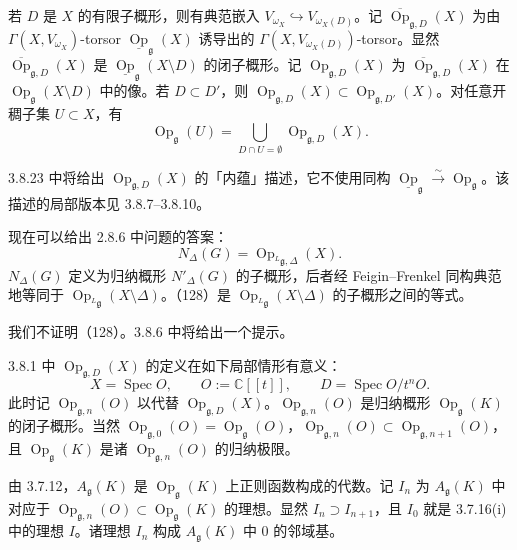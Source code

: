 
若 $D$ 是 $X$ 的有限子概形，则有典范嵌入 $V_{\omega_{X}}\hookrightarrow V_{\omega_{X}(D)}$。记 $\overline{\operatorname{Op}}_{\mathfrak{g},D}(X)$ 为由 $\Gamma(X,V_{\omega_{X}})$-torsor $\underline{\operatorname{Op}}_{\mathfrak{g}}(X)$ 诱导出的 $\Gamma(X,V_{\omega_{X}(D)})$-torsor。显然 $\overline{\operatorname{Op}}_{\mathfrak{g},D}(X)$ 是 $\underline{\operatorname{Op}}_{\mathfrak{g}}(X\setminus D)$ 的闭子概形。记 $\operatorname{Op}_{\mathfrak{g},D}(X)$ 为 $\overline{\operatorname{Op}}_{\mathfrak{g},D}(X)$ 在 $\operatorname{Op}_{\mathfrak{g}}(X\setminus D)$ 中的像。若 $D\subset D'$，则 $\operatorname{Op}_{\mathfrak{g},D}(X)\subset\operatorname{Op}_{\mathfrak{g},D'}(X)$。对任意开稠子集 $U\subset X$，有
\[
\operatorname{Op}_{\mathfrak{g}}(U)=\bigcup_{D\cap U=\emptyset}\operatorname{Op}_{\mathfrak{g},D}(X).
\]

3.8.23 中将给出 $\operatorname{Op}_{\mathfrak{g},D}(X)$ 的「内蕴」描述，它不使用同构 $\underline{\operatorname{Op}}_{\mathfrak{g}}\xrightarrow{\sim}\operatorname{Op}_{\mathfrak{g}}$。该描述的局部版本见 3.8.7--3.8.10。

 现在可以给出 2.8.6 中问题的答案：
\begin{equation}\tag{128}
  N_{\Delta}(G)=\operatorname{Op}_{{}^{L}\mathfrak{g},\Delta}(X).
\end{equation}
$N_{\Delta}(G)$ 定义为归纳概形 $N'_{\Delta}(G)$ 的子概形，后者经 Feigin--Frenkel 同构典范地等同于 $\operatorname{Op}_{{}^{L}\mathfrak{g}}(X\setminus\Delta)$。（128）是 $\operatorname{Op}_{{}^{L}\mathfrak{g}}(X\setminus\Delta)$ 的子概形之间的等式。

我们不证明（128）。3.8.6 中将给出一个提示。

 3.8.1 中 $\operatorname{Op}_{\mathfrak{g},D}(X)$ 的定义在如下局部情形有意义：
\[
X=\operatorname{Spec}O,\qquad O:=\mathbb{C}[[t]],\qquad D=\operatorname{Spec}O/t^{n}O.
\]
此时记 $\operatorname{Op}_{\mathfrak{g},n}(O)$ 以代替 $\operatorname{Op}_{\mathfrak{g},D}(X)$。$\operatorname{Op}_{\mathfrak{g},n}(O)$ 是归纳概形 $\operatorname{Op}_{\mathfrak{g}}(K)$ 的闭子概形。当然 $\operatorname{Op}_{\mathfrak{g},0}(O)=\operatorname{Op}_{\mathfrak{g}}(O)$，$\operatorname{Op}_{\mathfrak{g},n}(O)\subset\operatorname{Op}_{\mathfrak{g},n+1}(O)$，且 $\operatorname{Op}_{\mathfrak{g}}(K)$ 是诸 $\operatorname{Op}_{\mathfrak{g},n}(O)$ 的归纳极限。

由 3.7.12，$A_{\mathfrak{g}}(K)$ 是 $\operatorname{Op}_{\mathfrak{g}}(K)$ 上正则函数构成的代数。记 $I_{n}$ 为 $A_{\mathfrak{g}}(K)$ 中对应于 $\operatorname{Op}_{\mathfrak{g},n}(O)\subset\operatorname{Op}_{\mathfrak{g}}(K)$ 的理想。显然 $I_{n}\supset I_{n+1}$，且 $I_{0}$ 就是 3.7.16(i) 中的理想 $I$。诸理想 $I_{n}$ 构成 $A_{\mathfrak{g}}(K)$ 中 $0$ 的邻域基。

